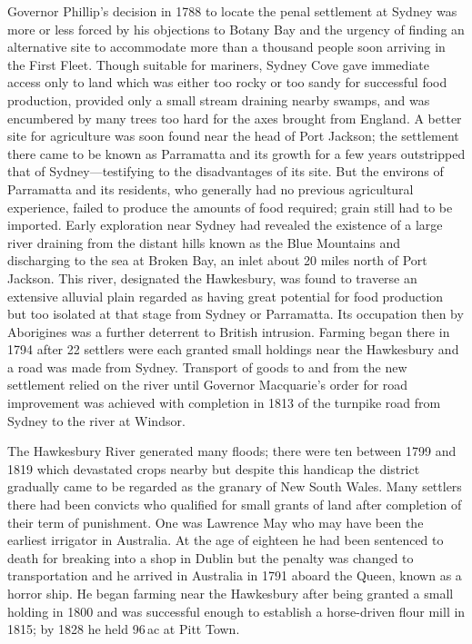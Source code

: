 Governor Phillip's decision in 1788 to locate the penal settlement at
Sydney was more or less forced by his objections to Botany Bay and the
urgency of finding an alternative site to accommodate more than a
thousand people soon arriving in the First Fleet.  Though suitable for
mariners, Sydney Cove gave immediate access only to land which was
either too rocky or too sandy for successful food production, provided
only a small stream draining nearby swamps, and was encumbered by many
trees too hard for the axes brought from England.  A better site for
agriculture was soon found near the head of Port Jackson; the
settlement there came to be known as Parramatta and its growth for a
few years outstripped that of Sydney---testifying to the disadvantages
of its site.  But the environs of Parramatta and its residents, who
generally had no previous agricultural experience, failed to produce
the amounts of food required; grain still had to be imported.  Early
exploration near Sydney had revealed the existence of a large river
draining from the distant hills known as the Blue Mountains and
discharging to the sea at Broken Bay, an inlet about 20 miles north of
Port Jackson.  This river, designated the Hawkesbury, was found to
traverse an extensive alluvial plain regarded as having great
potential for food production but too isolated at that stage from
Sydney or Parramatta.  Its occupation then by Aborigines was a further
deterrent to British intrusion.  Farming began there in 1794 after 22
settlers were each granted small holdings near the Hawkesbury and a
road was made from Sydney. Transport of
goods to and from the new settlement relied on the river until
Governor Macquarie's order for road improvement was achieved with
completion in 1813 of the turnpike road from Sydney to the river at
Windsor.

The Hawkesbury River generated many floods; there were ten between
1799 and 1819 which devastated crops nearby but despite this handicap
the district gradually came to be regarded as the granary of New South
Wales. Many settlers there had been convicts who qualified for small
grants of land after completion of their term of punishment. One was
Lawrence May who may have been the earliest irrigator in Australia. At
the age of eighteen he had been sentenced to death for breaking into a
shop in Dublin but the penalty was changed to transportation and he
arrived in Australia in 1791 aboard the Queen, known as a horror
ship. He began farming near the
Hawkesbury after being granted a small holding in 1800 and was
successful enough to establish a horse-driven flour mill in 1815; by
1828 he held 96\,ac at Pitt Town.

